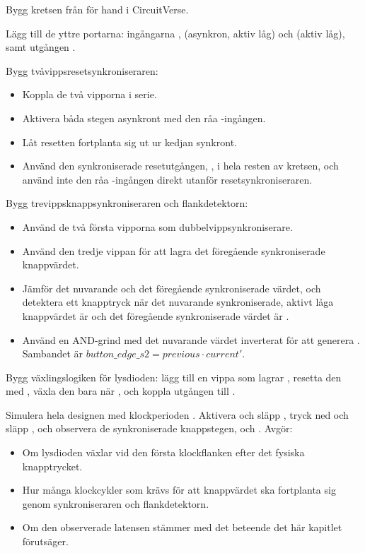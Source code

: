
\label{c4:ex:circuit}
Bygg kretsen  från  för hand i CircuitVerse.

 Lägg till de yttre portarna: ingångarna ,  (asynkron, aktiv
låg) och  (aktiv låg), samt utgången .

 Bygg tvåvippsresetsynkroniseraren:
\begin{itemize}
  \item Koppla de två vipporna i serie.
  \item Aktivera båda stegen asynkront med den råa -ingången.
  \item Låt resetten fortplanta sig ut ur kedjan synkront.
  \item Använd den synkroniserade resetutgången, , i hela resten av kretsen, och
    använd inte den råa -ingången direkt utanför resetsynkroniseraren.
\end{itemize}

 Bygg trevippsknappsynkroniseraren och flankdetektorn:
\begin{itemize}
  \item Använd de två första vipporna som dubbelvippsynkroniserare.
  \item Använd den tredje vippan för att lagra det föregående synkroniserade knappvärdet.
  \item Jämför det nuvarande och det föregående synkroniserade värdet, och detektera ett
    knapptryck när det nuvarande synkroniserade, aktivt låga knappvärdet är  och det
    föregående synkroniserade värdet är .
  \item Använd en AND-grind med det nuvarande värdet inverterat för att generera
    . Sambandet är
    $\mathit{button\_edge\_s2} = \mathit{previous} \cdot \mathit{current}'$.
\end{itemize}

 Bygg växlingslogiken för lysdioden: lägg till en vippa som lagrar , resetta
den med , växla den bara när , och koppla utgången
 till .

 Simulera hela designen med klockperioden . Aktivera och släpp
, tryck ned och släpp , och observera de synkroniserade knappstegen,
 och . Avgör:
\begin{itemize}
  \item Om lysdioden växlar vid den första klockflanken efter det fysiska knapptrycket.
  \item Hur många klockcykler som krävs för att knappvärdet ska fortplanta sig genom
    synkroniseraren och flankdetektorn.
  \item Om den observerade latensen stämmer med det beteende det här kapitlet förutsäger.
\end{itemize}

